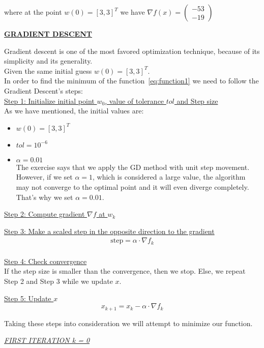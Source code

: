 where at the point $w\left(0\right) = \left[3, 3\right]^T$ we have $\nabla f(x) = \left(\begin{array}{c}
	-53 \\
	-19
\end{array}\right)$
\\[4mm]

\begin{center}
	\underline{\textbf{GRADIENT DESCENT}}
\end{center}
Gradient descent is one of the most favored optimization technique, because of its simplicity and its generality.\\
Given the same initial guess $w\left(0\right) = \left[3, 3\right]^T$. \\
In order to find the minimum of the function~\ref{eq:function1} we need to follow the Gradient Descent's steps:\\

\underline{Step 1: Initialize initial point $w_{0}$, value of tolerance $tol$ and Step size}\\
As we have mentioned, the initial values are:
\begin{itemize}
	\item $w\left(0\right) = \left[3, 3\right]^T$
	\item $tol = 10^{-6}$
	\item $\alpha = 0.01$\\
	The exercise says that we apply the GD method with unit step movement. However, if we set $\alpha = 1$, which is considered a large value, the algorithm may not converge to the optimal point and it will even diverge completely. That's why we set $\alpha = 0.01$. 
\end{itemize} 
\vspace{2mm}

\underline{Step 2: Compute gradient $\nabla f$ at $w_{k}$}
\vspace{4mm}

\underline{Step 3: Make a scaled step in the opposite direction to the gradient}\\
\begin{equation}
	\begin{gathered}
		\text{step} = \alpha \cdot \nabla f_{k}\\
	\end{gathered}
\end{equation}
\vspace{2mm}

\underline{Step 4: Check convergence}\\
If the step size is smaller than the convergence, then we stop. Else, we repeat Step 2 and Step 3 while we update $x$.
\vspace{4mm}

\underline{Step 5: Update $x$}
\begin{equation}
	x_{k+1} = x_{k} - \alpha \cdot \nabla f_{k}
\end{equation}
\vspace{4mm}

Taking these steps into consideration we will attempt to minimize our function.\\

\begin{center}
	\underline{\textit{FIRST ITERATION k = 0}}
\end{center}




